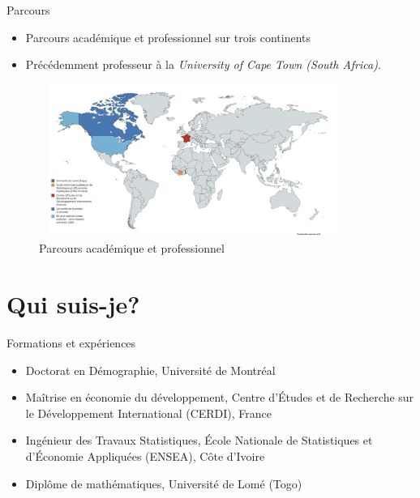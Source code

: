 \documentclass[xcolor=table]{beamer}
\begin{document}
\begin{frame}{Parcours}

\begin{itemize}
  \item Parcours académique et professionnel sur trois continents
  \item Précédemment professeur à la \textit{University of Cape Town (South Africa)}.
  

\end{itemize}


\begin{figure}
\centering
\includegraphics[width=10cm ,height= 5cm]{Parcours.jpg}
\caption{\label{fig:your-figure}Parcours académique et professionnel}
\end{figure}
\vskip 1cm

\end{frame}


\section{Qui suis-je?}

\begin{frame}{Formations et expériences}

\begin{itemize}
  \item Doctorat en Démographie, Université de Montréal
  \item Maîtrise en économie du développement, Centre d'Études et de Recherche sur le Développement International (CERDI), France
  \item Ingénieur des Travaux Statistiques, École Nationale de Statistiques et d'Économie Appliquées (ENSEA), Côte d'Ivoire
  \item Diplôme de mathématiques, Université de Lomé (Togo)

\end{itemize}

\vskip 1cm
\end{frame}
\end{document}

